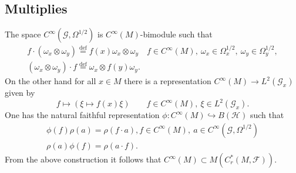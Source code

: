 \documentclass{beamer}
\theoremstyle{plain}
\newcommand{\be}{\begin{equation}}
\newcommand{\ee}{\end{equation}}
\newcommand{\Om}{\Omega}
\newcommand{\sF}{\mathcal{F}}       %
\newcommand{\sH}{\mathcal{H}}       %
\newcommand{\bydef}{\stackrel{\mathrm{def}}{=}}
\newcommand{\hookto}{\hookrightarrow}        %
\begin{document}
\subsection{Multiplies}
\begin{frame}
The space $C^{\infty} (\mathcal G , \Omega^{1/2})$ is $C^{\infty} \left(M\right)$-bimodule such that
\be\nonumber
\begin{split}
	f\cdot \left(\omega_x \otimes \omega_y \right) \bydef f\left(x \right)\omega_x \otimes \omega_y \quad f \in C^{\infty} \left(M\right),~\omega_x \in \Om^{1/2}_x, ~ \omega_y \in \Om^{1/2}_y, \\
	\left(\omega_x \otimes \omega_y \right) \cdot f \bydef \omega_x \otimes f\left(y \right)\omega_y.
\end{split}
\ee
On the other hand for all $x \in M$ there is a representation $C^{\infty} \left(M\right)\to L^2\left( \mathcal G_x\right)$ given by
$$
f \mapsto \left( \xi \mapsto f\left( x\right)\xi \right) \quad  \quad f \in C^{\infty} \left(M\right),~\xi \in L^2\left( \mathcal G_x\right).
$$
One has the natural faithful representation
$
\phi:  C^{\infty} \left(M\right)\hookto B\left(\sH \right)
$
such that
\be\nonumber
\begin{split}
	\phi\left( f\right) \rho\left( a\right) = \rho\left(f\cdot a \right),  f \in  C^{\infty} \left(M\right), ~a \in C^{\infty} (\mathcal G , \Omega^{1/2})\\
	\rho\left( a\right) \phi\left( f\right)= \rho\left(a\cdot f \right).
\end{split}
\ee
From the above construction it follows that $C^{\infty} \left(M\right)\subset M\left( C^*_r(M, \sF)\right)$. 
\end{frame}
\end{document}
